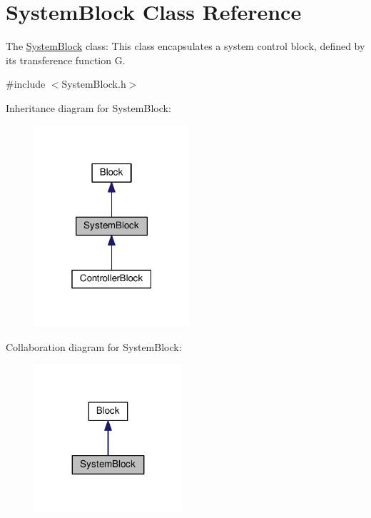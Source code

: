 \hypertarget{classSystemBlock}{}\section{System\+Block Class Reference}
\label{classSystemBlock}


The \hyperlink{classSystemBlock}{System\+Block} class\+: This class encapsulates a system control block, defined by its transference function G. 




{\ttfamily \#include $<$System\+Block.\+h$>$}



Inheritance diagram for System\+Block\+:
\nopagebreak
\begin{figure}[H]
\begin{center}
\leavevmode
\includegraphics[width=163pt]{classSystemBlock__inherit__graph}
\end{center}
\end{figure}


Collaboration diagram for System\+Block\+:
\nopagebreak
\begin{figure}[H]
\begin{center}
\leavevmode
\includegraphics[width=155pt]{classSystemBlock__coll__graph}
\end{center}
\end{figure}
